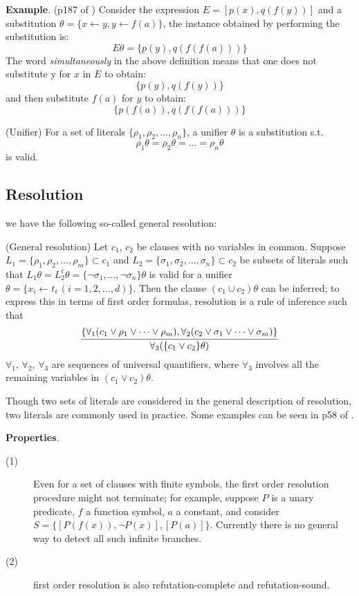 \documentclass{article}
\begin{document}
\noindent \textbf{Example}. (p187 of \cite{example})\newline
Consider the expression $E = [p(x), q(f(y))]$ and a substitution $\theta = \{x \leftarrow y, y \leftarrow f(a)\}$, the instance obtained by performing the substitution is:
\[
E\theta = \{p(y), q(f(f(a)))\}
\]
The word \textit{simultaneously} in the above definition means that one does not substitute y for
 $x$ in $E$ to obtain:
 \[
 \{p(y), q(f(y))\}
 \]
 and then substitute $f(a)$ for $y$ to obtain:
 \[
 \{p(f(a)),q(f(f(a)))\}
 \]

\begin{defin}(Unifier)\newline
For a set of literals $\{\rho_1,\rho_2,\dots,\rho_n\}$, a unifier $\theta$ is a substitution s.t. 
\[
\rho_1\theta = \rho_2\theta = \dots = \rho_n\theta
\]
is valid.
\end{defin}

\subsection{Resolution}
\noindent we have the following so-called general resolution:
\begin{theo}(General resolution)\newline
Let $c_1$, $c_2$ be clauses with no variables in common. Suppose $L_1 = \{\rho_1,\rho_2,\dots,\rho_m\} \subset c_1$ and $L_2 = \{\sigma_1,\sigma_2,\dots,\sigma_n\} \subset c_2$ be subsets of literals such that $L_1\theta = L_2^c \theta = \{\neg\sigma_1,\dots,\neg \sigma_n\}\theta$ is valid for a unifier $\theta = \{x_i \leftarrow t_i\,(i = 1,2,\dots,d)\}$. Then the clause $(c_1 \cup c_2)\theta$ can be inferred; to express this in terms of first order formulas, resolution is a rule of inference such that
\[
\infer{\forall_3(\{c_1 \vee c_2\}\theta)}{\{\forall_1(c_1 \vee \rho_1 \vee \dots \vee \rho_m), \forall_2(c_2 \vee \sigma_1 \vee \dots \vee \sigma_m)\}}
\]
$\forall_1$, $\forall_2$, $\forall_3$ are sequences of universal quantifiers, where $\forall_3$ involves all the remaining variables in $(c_1 \vee c_2)\theta$. 
\end{theo}
Though two sets of literals are considered in the general description of resolution, two literals are commonly used in practice. Some examples can be seen in p58 of \cite{example2}.\newline

\textbf{Properties}.
\begin{description}
\item[(1)] Even for a set of clauses with finite symbols, the first order resolution procedure might not terminate; for example, suppose $P$ is a unary predicate, $f$ a function symbol, $a$ a constant, and consider $S = \{[P(f(x)),\neg P(x)],[P(a)]\}$. Currently there is no general way to detect all such infinite branches. 
\item[(2)] first order resolution is also refutation-complete and refutation-sound.
\end{description}
\end{document}
